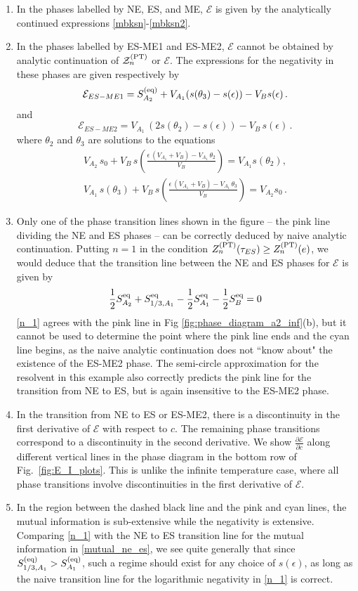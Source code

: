 \documentclass[a4paper,11pt]{article}
\newcommand{\be}{\begin{equation}}
\newcommand{\ee}{\end{equation}}
\newcommand\sE{{\ensuremath{{\mathcal E}}}}
\newcommand\sZ{{\mathcal Z}}
\begin{document}
\begin{enumerate}
\begin{enumerate} 
\item In the phases labelled by NE, ES, and ME, $\sE$ is given by the analytically continued expressions \eqref{mbksn}-\eqref{mbksn2}.
\item In the phases labelled by ES-ME1 and ES-ME2, $\sE$ cannot be obtained by analytic continuation of $\sZ_n^{\rm (PT)}$ or $\sE$. The expressions for the negativity in these phases are given respectively by 
\be 
\sE_{ES-ME1} = S^{\rm (eq)}_{A_2} + V_{A_1} (s(\theta_3)- s(\epsilon)) - V_B s(\epsilon) \,. 
\label{ln_4_mt}
\ee
and 
\be 
\sE_{ES-ME2} = V_{A_1} \, (2 s(\theta_2)- s(\epsilon)) - V_B \, s(\epsilon) \, . 
\label{ln_5_mt}
\ee
where $\theta_2$ and $\theta_3$ are solutions to the equations 
\be 
\begin{gathered} 
V_{A_2}\, s_0 + V_B\, s\left(\frac{\epsilon\, (V_{A_1}+ V_B)- V_{A_1}\, \theta_2}{V_{B}} \right) = V_{A_1} s(\theta_2), \\
V_{A_1}\, s(\theta_3) + V_B\, s\left(\frac{\epsilon\, (V_{A_1}+ V_B)- V_{A_1}\, \theta_3}{V_{B}} \right) = V_{A_2} s_0\, . 
\end{gathered} 
\ee
\item Only one of the phase transition lines shown in the figure -- the pink line dividing the NE and ES phases -- can be correctly deduced by naive analytic continuation. Putting $n=1$ in the condition $Z_n^{\rm (PT)}(\tau_{ES})\geq Z_n^{\rm (PT)}(e)$, we would deduce that the transition line between the NE and ES phases for $\sE$ is given by 
\be 
\frac{1}{2}S_{A_2}^{\rm eq} + S_{1/3, A_1}^{\rm eq} - \frac{1}{2} S_{A_1}^{\rm eq} - \frac{1}{2} S^{\rm eq}_{B}=0 \label{n_1}
\ee
\eqref{n_1} agrees with the pink line in Fig \ref{fig:phase_diagram_a2_inf}(b), but it cannot be used to determine the point where the pink line ends and the cyan line begins, as the naive analytic continuation does not ``know about" the existence of the ES-ME2 phase. The semi-circle approximation for the resolvent in this example also correctly predicts the pink line for the transition from NE to ES, but is again insensitive to the ES-ME2 phase.
\item In the transition from NE to ES or ES-ME2, there is a discontinuity in the first derivative of $\sE$ with respect to $c$. The remaining phase transitions correspond to a discontinuity in the second derivative. We show $\frac{\partial \sE}{\partial c}$ along different vertical lines in the phase diagram in the bottom row of Fig.~\ref{fig:E_I_plots}. This is unlike the infinite temperature case, where all phase transitions involve discontinuities in the first derivative of $\sE$. 
\item In the region between the dashed black line and the pink and cyan lines, the mutual information is sub-extensive while the negativity is extensive. Comparing \eqref{n_1} with the NE to ES transition line for the mutual information in \eqref{mutual_ne_es}, we see quite generally that since $S^{\rm (eq)}_{1/3, A_1}> S^{\rm (eq)}_{A_1}$, such a regime should exist for any choice of $s(\epsilon)$, as long as the naive transition line for the logarithmic negativity in \eqref{n_1} is correct.


\end{enumerate}
\end{enumerate}
\end{document}
